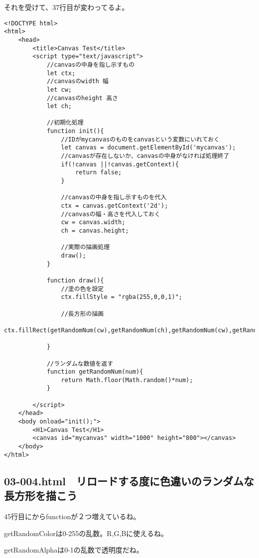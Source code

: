 \documentclass[mingoth,11pt,a4j,uplatex]{jsarticle}
\begin{document}
それを受けて、37行目が変わってるよ。
\begin{lstlisting}[caption=リロードする度にランダムな長方形を描こう]
<!DOCTYPE html>
<html>
	<head>
		<title>Canvas Test</title>
		<script type="text/javascript">
			//canvasの中身を指し示すもの
			let ctx;
			//canvasのwidth 幅
			let cw;
			//canvasのheight 高さ
			let ch;
			
			//初期化処理
			function init(){
				//IDがmycanvasのものをcanvasという変数にいれておく
				let canvas = document.getElementById('mycanvas');
				//canvasが存在しないか、canvasの中身がなければ処理終了
				if(!canvas ||!canvas.getContext){
					return false;
				}
				
				//canvasの中身を指し示すものを代入
				ctx = canvas.getContext('2d');
				//canvasの幅・高さを代入しておく
				cw = canvas.width;
				ch = canvas.height;
				
				//実際の描画処理
				draw();
			}
			
			function draw(){
				//塗の色を設定
				ctx.fillStyle = "rgba(255,0,0,1)";
				
				//長方形の描画
				ctx.fillRect(getRandomNum(cw),getRandomNum(ch),getRandomNum(cw),getRandomNum(ch));

			}
			
			//ランダムな数値を返す
			function getRandomNum(num){
				return Math.floor(Math.random()*num);
			}

		</script>
	</head>
	<body onload="init();">
		<H1>Canvas Test</H1>
		<canvas id="mycanvas" width="1000" height="800"></canvas>
	</body>
</html>
\end{lstlisting}

\subsection{03-004.html　リロードする度に色違いのランダムな長方形を描こう}
45行目にからfunctionが２つ増えているね。

getRandomColorは0-255の乱数。R,G,Bに使えるね。

getRandomAlphaは0-1の乱数で透明度だね。
\end{document}
